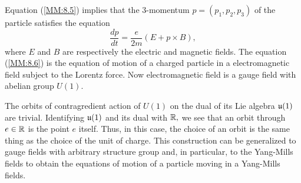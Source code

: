 Equation (\ref{MM:8.5}) implies that the 3-momentum $p=(p_{1}, p_{2}, p_{3})$ of the particle satisfies the equation
\begin{equation}
 \label{MM:8.6}
\frac{dp}{dt}=\frac{e}{2m}(E + p \times B),
\end{equation}
where $E$ and $B$ are respectively the electric and magnetic fields. The equation (\ref{MM:8.6}) is the equation of
motion of a charged particle in a electromagnetic field subject to the Lorentz force. Now electromagnetic field is a
gauge field with abelian group $U(1).$

The orbits of contragredient action of $U(1)$ on the dual of its Lie algebra  $\mathfrak{u}(1)$ are trivial. Identifying
$\mathfrak{u}(1)$ and its dual with $\mathbb R,$ we see that an orbit through $e\in \mathbb R$ is the point $e$ itself. Thus, in this
case, the choice of an orbit is the same thing as the choice of the unit of charge. This construction can be
generalized to gauge fields with arbitrary structure group and, in particular, to the Yang-Mills fields to obtain the
equations of motion of a particle moving in a Yang-Mills fields. 
